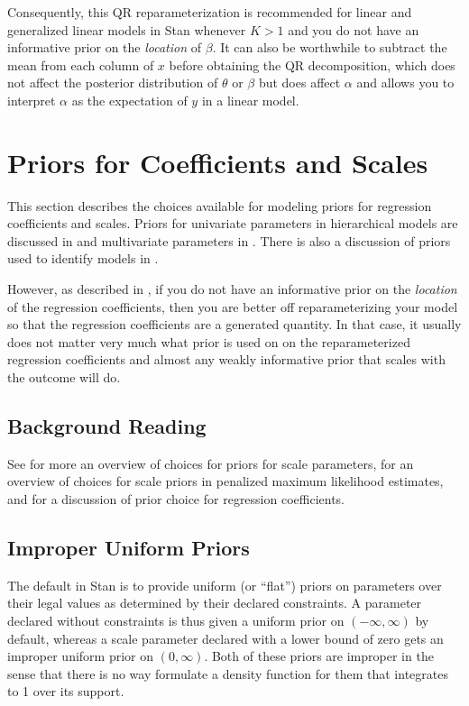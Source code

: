 Consequently, this QR reparameterization is recommended for linear and
generalized linear models in Stan whenever $K > 1$ and you do not have an
informative prior on the \emph{location} of $\beta$. It can also be
worthwhile to subtract the mean from each column of $x$ before obtaining
the QR decomposition, which does not affect the posterior distribution of
$\theta$ or $\beta$ but does affect $\alpha$ and allows you to interpret
$\alpha$ as the expectation of $y$ in a linear model.

\section{Priors for Coefficients and Scales}\label{regression-priors.section}

This section describes the choices available for modeling priors for
regression coefficients and scales.  Priors for univariate parameters
in hierarchical models are discussed in
 and multivariate parameters in
. There is also a
discussion of priors used to identify models in
. 

However, as described in , if you do 
not have an informative prior on the \emph{location} of the regression 
coefficients, then you are better off reparameterizing your model so 
that the regression coefficients are a generated quantity. In that case,
it usually does not matter very much what prior is used on on the
reparameterized regression coefficients and almost any weakly informative
prior that scales with the outcome will do.

\subsection{Background Reading}

See \citep{Gelman:2006} for more an overview of choices for priors for
scale parameters, \citep{ChungEtAl:2013} for an overview of choices
for scale priors in penalized maximum likelihood estimates, and
\cite{GelmanJakulinPittauEtAl:2008} for a discussion of prior choice
for regression coefficients.

\subsection{Improper Uniform Priors}

The default in Stan is to provide uniform (or ``flat'') priors on
parameters over their legal values as determined by their declared
constraints.  A parameter declared without constraints is thus given a
uniform prior on $(-\infty,\infty)$ by default, whereas a scale
parameter declared with a lower bound of zero gets an improper uniform
prior on $(0,\infty)$.  Both of these priors are improper in the sense
that there is no way formulate a density function for them that
integrates to 1 over its support.

